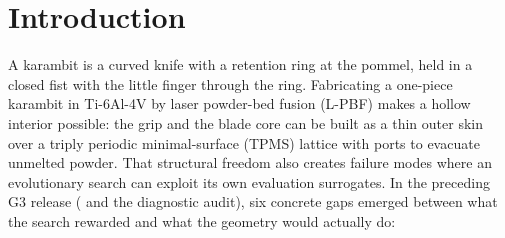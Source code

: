 \section{Introduction}\label{sec:intro}
A karambit is a curved knife with a retention ring at the pommel, held in a closed fist with the little finger through the
ring. Fabricating a one-piece karambit in Ti-6Al-4V by laser powder-bed fusion (L-PBF) makes a hollow interior possible:
the grip and the blade core can be built as a thin outer skin over a triply periodic minimal-surface (TPMS) lattice with
ports to evacuate unmelted powder. That structural freedom also creates failure modes where an evolutionary search can
exploit its own evaluation surrogates. In the preceding G3 release ( and the  diagnostic audit),
six concrete gaps emerged between what the search rewarded and what the geometry would actually do:
